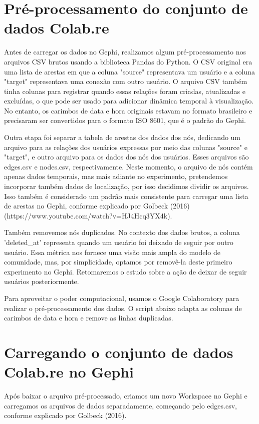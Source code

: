\section{Pré-processamento do conjunto de dados Colab.re}

Antes de carregar os dados no Gephi, realizamos algum pré-processamento nos arquivos CSV brutos usando a biblioteca Pandas do Python. O CSV original era uma lista de arestas em que a coluna "source" representava um usuário e a coluna "target" representava uma conexão com outro usuário. O arquivo CSV também tinha colunas para registrar quando essas relações foram criadas, atualizadas e excluídas, o que pode ser usado para adicionar dinâmica temporal à visualização. No entanto, os carimbos de data e hora originais estavam no formato brasileiro e precisaram ser convertidos para o formato ISO 8601, que é o padrão do Gephi.

Outra etapa foi separar a tabela de arestas dos dados dos nós, dedicando um arquivo para as relações dos usuários expressas por meio das colunas "source" e "target", e outro arquivo para os dados dos nós dos usuários. Esses arquivos são edges.csv e nodes.csv, respectivamente. Neste momento, o arquivo de nós contém apenas dados temporais, mas mais adiante no experimento, pretendemos incorporar também dados de localização, por isso decidimos dividir os arquivos. Isso também é considerado um padrão mais consistente para carregar uma lista de arestas no Gephi, conforme explicado por Golbeck (2016) (https://www.youtube.com/watch?v=HJ4Hcq3YX4k).

Também removemos nós duplicados. No contexto dos dados brutos, a coluna 'deleted\_at' representa quando um usuário foi deixado de seguir por outro usuário. Essa métrica nos fornece uma visão mais ampla do modelo de comunidade, mas, por simplicidade, optamos por removê-la deste primeiro experimento no Gephi. Retomaremos o estudo sobre a ação de deixar de seguir usuários posteriormente.

Para aproveitar o poder computacional, usamos o Google Colaboratory para realizar o pré-processamento dos dados. O script abaixo adapta as colunas de carimbos de data e hora e remove as linhas duplicadas.

\section{Carregando o conjunto de dados Colab.re no Gephi}
Após baixar o arquivo pré-processado, criamos um novo Workspace no Gephi e carregamos os arquivos de dados separadamente, começando pelo edges.csv, conforme explicado por Golbeck (2016).


